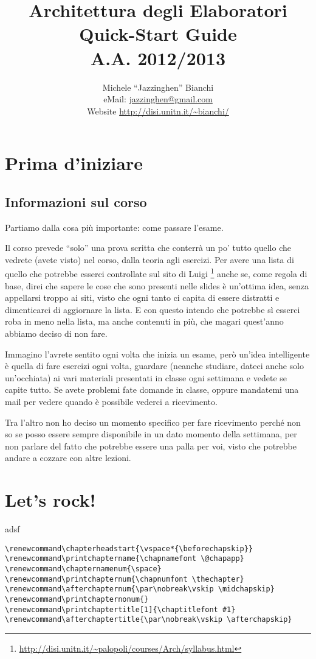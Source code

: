 \documentclass[a4paper]{memoir}
\title{Architettura degli Elaboratori \\ Quick-Start Guide \\ A.A. 2012/2013}
\author{Michele ``Jazzinghen'' Bianchi \\ eMail: \url{jazzinghen@gmail.com} \\%
	Website \url{http://disi.unitn.it/~bianchi/}}
\begin{document}
\maketitle

\chapter*{Prima d'iniziare}
	
	
	
	\section*{Informazioni sul corso}
	
		Partiamo dalla cosa più importante: come passare l'esame.
		
		Il corso prevede ``solo'' una prova scritta che conterrà un po' tutto quello
		che vedrete (avete visto) nel corso, dalla teoria agli esercizi. Per avere
		una lista di quello che potrebbe esserci controllate sul sito di Luigi
		\footnote{\url{http://disi.unitn.it/~palopoli/courses/Arch/syllabus.html}}
		anche se, come regola di base, direi che sapere le cose che sono presenti
		nelle slides è un'ottima idea, senza appellarsi troppo ai siti, visto che
		ogni tanto ci capita di essere distratti e dimenticarci di aggiornare la
		lista. E con questo intendo che potrebbe sì esserci roba in meno nella lista,
		ma anche contenuti in più, che magari quest'anno abbiamo deciso di non fare.
		
		Immagino
		l'avrete sentito ogni volta che inizia un esame, però un'idea intelligente
		è quella di fare esercizi ogni volta, guardare (neanche studiare, dateci anche
		solo un'occhiata) ai vari materiali presentati in classe ogni settimana e
		vedete se capite tutto. Se avete problemi fate domande in classe, oppure
		mandatemi una mail per vedere quando è possibile vederci a ricevimento.
		
		Tra l'altro non ho deciso un momento specifico per fare ricevimento perché
		non so se posso essere sempre disponibile in un dato momento della settimana,
		per non parlare del fatto che potrebbe essere una palla per voi, visto che
		potrebbe andare a cozzare con altre lezioni.

\chapter{Let's rock!}
adsf

\begin{Verbatim}[label=test]
\renewcommand\chapterheadstart{\vspace*{\beforechapskip}}
\renewcommand\printchaptername{\chapnamefont \@chapapp}
\renewcommand\chapternamenum{\space}
\renewcommand\printchapternum{\chapnumfont \thechapter}
\renewcommand\afterchapternum{\par\nobreak\vskip \midchapskip}
\renewcommand\printchapternonum{}
\renewcommand\printchaptertitle[1]{\chaptitlefont #1}
\renewcommand\afterchaptertitle{\par\nobreak\vskip \afterchapskip}
\end{Verbatim}
\end{document}
